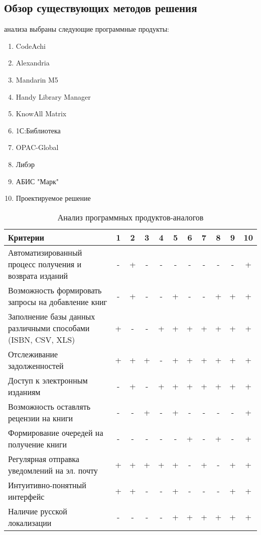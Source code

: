 \documentclass[./intro.tex]{subfiles}
\begin{document}
\subsection{Обзор существующих методов решения}
 анализа выбраны следующие программные продукты:
\begin{enumerate}
    \item CodeAchi \cite{Codeachi}
    \item Alexandria \cite{Alexandria}
    \item Mandarin M5 \cite{Mandarin}
    \item Handy Library Manager
    \item KnowAll Matrix \cite{KnowAll}
    \item 1С:Библиотека
    \item OPAC-Global
    \item Либэр
    \item АБИС "Марк"
    \item Проектируемое решение
\end{enumerate}

\begin{table}[h]
    \caption{Анализ программных продуктов-аналогов}
    \label{table:1}
    \begin{tabular}{|p{8.5cm}|c|c|c|c|c|c|c|c|c|c|}
        \hline
        Критерии & 1 & 2 & 3 & 4 & 5 & 6 & 7 & 8 & 9 & 10\\
        \hline
        Автоматизированный процесс получения и возврата изданий & - & + & - & - & - & - & - & - & - & + \\
        \hline
        Возможность формировать запросы на добавление книг & - & + & - & - & + & - & - & + & + & + \\
        \hline
        Заполнение базы данных различными способами (ISBN, CSV, XLS) & + & - & - & + & + & + & + & + & + & + \\
        \hline
        Отслеживание задолженностей & + & + & + & - & + & + & + & + & + & + \\
        \hline
        Доступ к электронным изданиям & - & + & - & + & + & + & + & + & + & + \\
        \hline
        Возможность оставлять рецензии на книги & - & - & + & - & + & - & - & - & - & + \\
        \hline
        Формирование очередей на получение книги & - & - & - & - & - & + & - & + & - & + \\
        \hline
        Регулярная отправка уведомлений на эл. почту & + & + & + & + & + & - & + & - & + & + \\
        \hline
        Интуитивно-понятный интерфейс & + & + & - & - & + & - & - & - & + & + \\
        \hline
        Наличие русской локализации & - & - & - & - & + & + & + & + & + & + \\
        \hline
    \end{tabular}    
\end{table}
\end{document}
